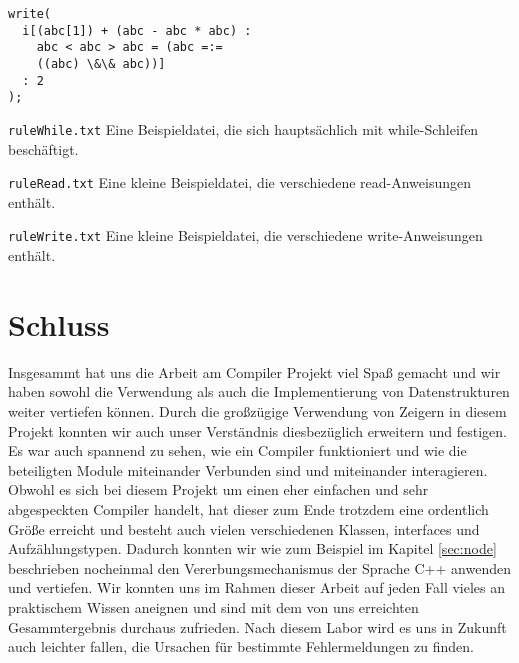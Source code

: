 \documentclass[
a4paper,   %
11pt,      %
oneside,   %
onecolumn, %
final      %
]{article}
\begin{document}
\begin{description}
\begin{lstlisting}[language=SysProgLang, caption={ruleBrackets.txt}, label=lst:testBrackets]
write(
  i[(abc[1]) + (abc - abc * abc) : 
    abc < abc > abc = (abc =:=
    ((abc) \&\& abc))]
  : 2
);
\end{lstlisting}

\item{\texttt{ruleWhile.txt}} Eine Beispieldatei, die sich hauptsächlich mit while-Schleifen beschäftigt.

\item{\texttt{ruleRead.txt}} Eine kleine Beispieldatei, die verschiedene read-Anweisungen enthält. 

\item{\texttt{ruleWrite.txt}} Eine kleine Beispieldatei, die verschiedene write-Anweisungen enthält.
\end{description}

\section{Schluss}
Insgesammt hat uns die Arbeit am Compiler Projekt viel Spaß gemacht und wir haben sowohl die Verwendung als auch die Implementierung von Datenstrukturen weiter vertiefen können. Durch die großzügige Verwendung von Zeigern in diesem Projekt konnten wir auch unser Verständnis diesbezüglich erweitern und festigen. Es war auch spannend zu sehen, wie ein Compiler funktioniert und wie die beteiligten Module miteinander Verbunden sind und miteinander interagieren. Obwohl es sich bei diesem Projekt um einen eher einfachen und sehr abgespeckten Compiler handelt, hat dieser zum Ende trotzdem eine ordentlich Größe erreicht und besteht auch vielen verschiedenen Klassen, interfaces und Aufzählungstypen. Dadurch konnten wir wie zum Beispiel im Kapitel \ref{sec:node} beschrieben nocheinmal den Vererbungsmechanismus der Sprache C++ anwenden und vertiefen. Wir konnten uns im Rahmen dieser Arbeit auf jeden Fall vieles an praktischem Wissen aneignen und sind mit dem von uns erreichten Gesammtergebnis durchaus zufrieden. Nach diesem Labor wird es uns in Zukunft auch leichter fallen, die Ursachen für bestimmte Fehlermeldungen zu finden.
\end{document}
